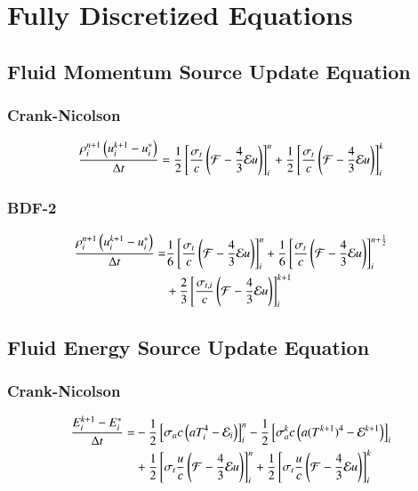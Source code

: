 \documentclass[preprint,12pt]{elsarticle}
\begin{document}
\section{Fully Discretized Equations}
\subsection{Fluid Momentum Source Update Equation}
\subsubsection{Crank-Nicolson}
\begin{equation}
  \frac{\rho_i^{n+1}\left(u_i^{k+1}-u_i^*\right)}{\Delta t} = 
   \frac{1}{2}\left[\frac{\sigma_{t}}{c}\left(\mathcal{F}-\frac{4}{3}\mathcal{E} u\right)\right]_i^n
  +\frac{1}{2}\left[\frac{\sigma_{t}}{c}\left(\mathcal{F}-\frac{4}{3}\mathcal{E} u\right)\right]_i^k
\end{equation}

\subsubsection{BDF-2}
\begin{equation}\begin{split}
  \frac{\rho_i^{n+1}\left(u_i^{k+1}-u_i^*\right)}{\Delta t} =  
  & \frac{1}{6}\left[\frac{\sigma_{t}}{c}\left(\mathcal{F}-\frac{4}{3}\mathcal{E} u\right)\right]_i^n
   +\frac{1}{6}\left[\frac{\sigma_{t}}{c}\left(\mathcal{F}-\frac{4}{3}\mathcal{E} u\right)\right]_i^{n+\frac{1}{2}}\\
  &+\frac{2}{3}\left[\frac{\sigma_{t,i}}{c}\left(\mathcal{F}-\frac{4}{3}\mathcal{E} u\right)\right]_i^{k+1}
\end{split}\end{equation}

\subsection{Fluid Energy Source Update Equation}
\subsubsection{Crank-Nicolson}
\begin{equation}\begin{split}
  \frac{E_i^{k+1}-E_i^*}{\Delta t} = &
  -\frac{1}{2}\left[\sigma_{a} c\left(aT_i^4 - \mathcal{E}_i\right)\right]_i^n
  -\frac{1}{2}\left[\sigma_{a}^k c\left(a(T^{k+1})^4 - \mathcal{E}^{k+1}\right)\right]_i\\
  &+\frac{1}{2}\left[\sigma_{t}\frac{u}{c}\left(\mathcal{F}-\frac{4}{3}\mathcal{E} u\right)\right]_i^n
   +\frac{1}{2}\left[\sigma_{t}\frac{u}{c}\left(\mathcal{F}-\frac{4}{3}\mathcal{E} u\right)\right]_i^k
\end{split}\end{equation}
\end{document}
